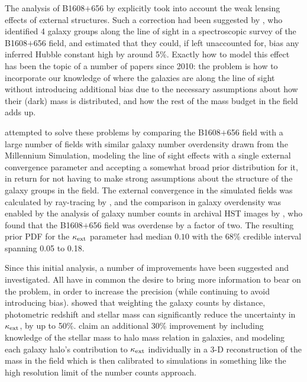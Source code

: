 

The analysis of B1608$+$656 by \citet{Suy++10} explicitly took into
account the weak lensing effects of external structures.  Such a
correction had been suggested by \citet{Fas++06b}, who identified 4
galaxy groups along the line of sight in a spectroscopic survey of the
B1608$+$656 field, and estimated that they could, if left unaccounted
for, bias any inferred Hubble constant high by around 5\%. Exactly how
to  model this effect has been the topic of a number of papers since
2010: the problem is  how to incorporate our knowledge of where the
galaxies are along the line of sight without introducing additional
bias due to the necessary assumptions about how their (dark) mass is
distributed, and how the rest of the mass budget in the field adds up.

\citet{Suy++10} attempted to solve these problems by comparing the
B1608$+$656 field with a large number of fields with similar  galaxy
number overdensity drawn from the Millennium Simulation, modeling the
line of sight effects with a single external convergence parameter and
accepting a somewhat broad prior distribution for it, in return for not
having to make  strong assumptions about the structure of the galaxy
groups in the field. The external convergence in the simulated fields
was calculated by ray-tracing by \citet{Hil++09}, and the
comparison in galaxy overdensity was enabled by the analysis of galaxy
number counts in archival HST images by \citet{FKW11}, who found that
the B1608$+$656 field was overdense by a factor of two. The resulting
prior PDF for the $\kappa_{\rm ext}$ parameter had median $0.10$ with
the 68\% credible interval spanning 0.05 to 0.18.

Since this initial analysis, a number of improvements have been
suggested and investigated. All have in common the desire to bring more
information  to bear on the problem, in order to increase the precision
(while  continuing to avoid introducing bias). \citet{Gre++13} showed
that weighting the galaxy counts by distance, photometric redshift and
stellar mass  can significantly reduce the uncertainty in $\kappa_{\rm
ext}$, by up to 50\%. \citet{Col++13} claim an additional 30\%
improvement  by including knowledge of the stellar mass to halo mass
relation in galaxies,  and modeling each galaxy halo's contribution to
$\kappa_{\rm ext}$ individually in a  3-D reconstruction of the mass in
the field which is then calibrated to simulations in something like the
high resolution limit of the number counts approach. 








